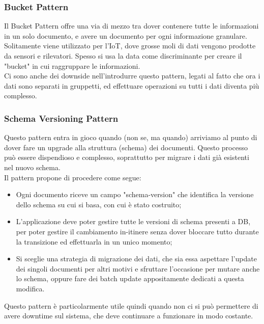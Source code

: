 \subsubsection{Bucket Pattern}
Il Bucket Pattern offre una via di mezzo tra dover contenere tutte le informazioni in un solo documento, e avere un documento per ogni informazione granulare.\\
Solitamente viene utilizzato per l'IoT, dove grosse moli di dati vengono prodotte da sensori e rilevatori. Spesso si usa la data come discriminante per creare il "bucket" in cui raggruppare le informazioni.\\
Ci sono anche dei downside nell'introdurre questo pattern, legati al fatto che ora i dati sono separati in gruppetti, ed effettuare operazioni su tutti i dati diventa più complesso.\\

\subsubsection{Schema Versioning Pattern}
Questo pattern entra in gioco quando (non se, ma quando) arriviamo al punto di dover fare un upgrade alla struttura (schema) dei documenti. Questo processo può essere dispendioso e complesso, soprattutto per migrare i dati già esistenti nel nuovo schema.\\
Il pattern propone di procedere come segue:
\begin{itemize}
    \item Ogni documento riceve un campo "schema-version" che identifica la versione dello schema su cui si basa, con cui è stato costruito;
    \item L'applicazione deve poter gestire tutte le versioni di schema presenti a DB, per poter gestire il cambiamento in-itinere senza dover bloccare tutto durante la transizione ed effettuarla in un unico momento;
    \item Si sceglie una strategia di migrazione dei dati, che sia essa aspettare l'update dei singoli documenti per altri motivi e sfruttare l'occasione per mutare anche lo schema, oppure fare dei batch update appositamente dedicati a questa modifica.
\end{itemize}
\noindent Questo pattern è particolarmente utile quindi quando non ci si può permettere di avere downtime sul sistema, che deve continuare a funzionare in modo costante.\\

